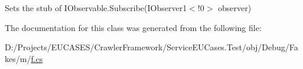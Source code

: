 Sets the stub of I\-Observable{.\-Subscribe(I\-Observer}1$<$!0$>$ observer)



The documentation for this class was generated from the following file\-:\begin{DoxyCompactItemize}
\item 
D\-:/\-Projects/\-E\-U\-C\-A\-S\-E\-S/\-Crawler\-Framework/\-Service\-E\-U\-Cases.\-Test/obj/\-Debug/\-Fakes/m/\hyperlink{m_2f_8cs}{f.\-cs}\end{DoxyCompactItemize}
